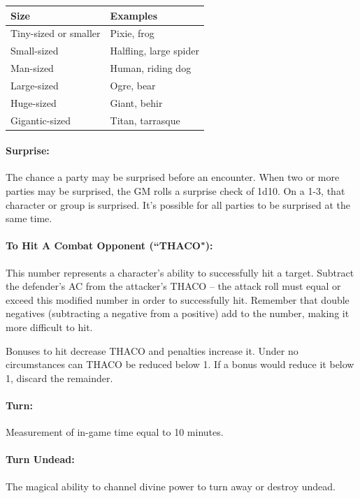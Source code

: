 \begin{multicols}{2}
\noindent
\begin{tabular}{|p{}|p{}|}
\hline
Size	& Examples \\
\hline\hline
\rowcolor[gray]{.9}Tiny-sized or smaller 	& Pixie, frog \\
Small-sized	& Halfling, large spider \\
\rowcolor[gray]{.9}Man-sized	& Human, riding dog \\
Large-sized 	& Ogre, bear \\
\rowcolor[gray]{.9}Huge-sized	& Giant, behir \\
Gigantic-sized	& Titan, tarrasque \\
\hline
\end{tabular}

\paragraph{Surprise:} The chance a party may be surprised before an encounter.  When two or more parties may be surprised, the GM rolls a surprise check of 1d10.  On a 1-3, that character or group is surprised.  It's possible for all parties to be surprised at the same time.

\paragraph{To Hit A Combat Opponent (``THACO"):} This number represents a character's ability to successfully hit a target.  Subtract the defender's AC from the attacker's THACO -- the attack roll must equal or exceed this modified number in order to successfully hit.  Remember that double negatives (subtracting a negative from a positive) add to the number, making it more difficult to hit.  

Bonuses to hit decrease THACO and penalties increase it.  Under no circumstances can THACO be reduced below 1.  If a bonus would reduce it below 1, discard the remainder.

\paragraph{Turn:} Measurement of in-game time equal to 10 minutes.

\paragraph{Turn Undead:} The magical ability to channel divine power to turn away or destroy undead.
 

\end{multicols}
